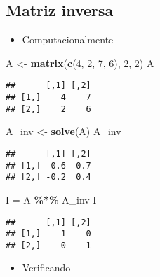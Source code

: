 \documentclass[
]{article}
\newenvironment{Shaded}{\begin{snugshade}}{\end{snugshade}}
\newcommand{\DecValTok}[1]{\textcolor[rgb]{0.00,0.00,0.81}{#1}}
\newcommand{\FunctionTok}[1]{\textcolor[rgb]{0.13,0.29,0.53}{\textbf{#1}}}
\newcommand{\NormalTok}[1]{#1}
\newcommand{\OtherTok}[1]{\textcolor[rgb]{0.56,0.35,0.01}{#1}}
\newcommand{\SpecialCharTok}[1]{\textcolor[rgb]{0.81,0.36,0.00}{\textbf{#1}}}
\providecommand{\tightlist}{%
  \setlength{\itemsep}{0pt}\setlength{\parskip}{0pt}}
\begin{document}
\hypertarget{matriz-inversa}{%
\subsection{Matriz inversa}\label{matriz-inversa}}

\begin{itemize}
\tightlist
\item
  Computacionalmente
\end{itemize}

\begin{Shaded}
\begin{Highlighting}[]
\NormalTok{A }\OtherTok{\textless{}{-}} \FunctionTok{matrix}\NormalTok{(}\FunctionTok{c}\NormalTok{(}\DecValTok{4}\NormalTok{, }\DecValTok{2}\NormalTok{, }\DecValTok{7}\NormalTok{, }\DecValTok{6}\NormalTok{), }\DecValTok{2}\NormalTok{, }\DecValTok{2}\NormalTok{)}
\NormalTok{A}
\end{Highlighting}
\end{Shaded}

\begin{verbatim}
##      [,1] [,2]
## [1,]    4    7
## [2,]    2    6
\end{verbatim}

\begin{Shaded}
\begin{Highlighting}[]
\NormalTok{A\_inv }\OtherTok{\textless{}{-}} \FunctionTok{solve}\NormalTok{(A)}
\NormalTok{A\_inv}
\end{Highlighting}
\end{Shaded}

\begin{verbatim}
##      [,1] [,2]
## [1,]  0.6 -0.7
## [2,] -0.2  0.4
\end{verbatim}

\begin{Shaded}
\begin{Highlighting}[]
\NormalTok{I }\OtherTok{=}\NormalTok{ A }\SpecialCharTok{\%*\%}\NormalTok{ A\_inv}
\NormalTok{I}
\end{Highlighting}
\end{Shaded}

\begin{verbatim}
##      [,1] [,2]
## [1,]    1    0
## [2,]    0    1
\end{verbatim}

\begin{itemize}
\tightlist
\item
  Verificando
\end{itemize}
\end{document}
